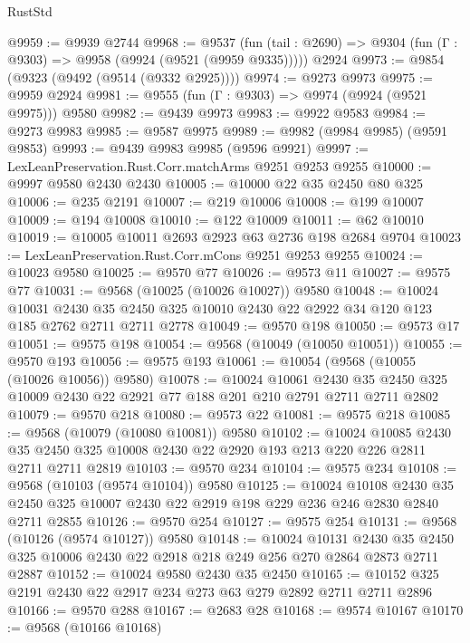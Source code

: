 \begin{lexlean}{RustStd}
\begin{coremodule}
{\begin{coremodule}
{{{{{{{{{{{{{{{{{{{{{{{{{{{{{{{{{{{{{{{{{{{{{{{{{{{{{{{@9959 := @9939 @2744
@9968 := @9537
    (fun (tail : @2690) => @9304 (fun (Γ : @9303) => @9958 (@9924 (@9521 (@9959 @9335)))))
    @2924
@9973 := @9854 (@9323 (@9492 (@9514 (@9332 @2925))))
@9974 := @9273 @9973
@9975 := @9959 @2924
@9981 := @9555 (fun (Γ : @9303) => @9974 (@9924 (@9521 @9975))) @9580
@9982 := @9439 @9973
@9983 := @9922 @9583
@9984 := @9273 @9983
@9985 := @9587 @9975
@9989 := @9982 (@9984 @9985) (@9591 @9853)
@9993 := @9439 @9983 @9985 (@9596 @9921)
@9997 := LexLeanPreservation.Rust.Corr.matchArms @9251 @9253 @9255
@10000 := @9997 @9580 @2430 @2430
@10005 := @10000 @22 @35 @2450 @80 @325
@10006 := @235 @2191
@10007 := @219 @10006
@10008 := @199 @10007
@10009 := @194 @10008
@10010 := @122 @10009
@10011 := @62 @10010
@10019 := @10005 @10011 @2693 @2923 @63 @2736 @198 @2684 @9704
@10023 := LexLeanPreservation.Rust.Corr.mCons @9251 @9253 @9255
@10024 := @10023 @9580
@10025 := @9570 @77
@10026 := @9573 @11
@10027 := @9575 @77
@10031 := @9568 (@10025 (@10026 @10027)) @9580
@10048 := @10024
    @10031
    @2430
    @35
    @2450
    @325
    @10010
    @2430
    @22
    @2922
    @34
    @120
    @123
    @185
    @2762
    @2711
    @2711
    @2778
@10049 := @9570 @198
@10050 := @9573 @17
@10051 := @9575 @198
@10054 := @9568 (@10049 (@10050 @10051))
@10055 := @9570 @193
@10056 := @9575 @193
@10061 := @10054 (@9568 (@10055 (@10026 @10056)) @9580)
@10078 := @10024
    @10061
    @2430
    @35
    @2450
    @325
    @10009
    @2430
    @22
    @2921
    @77
    @188
    @201
    @210
    @2791
    @2711
    @2711
    @2802
@10079 := @9570 @218
@10080 := @9573 @22
@10081 := @9575 @218
@10085 := @9568 (@10079 (@10080 @10081)) @9580
@10102 := @10024
    @10085
    @2430
    @35
    @2450
    @325
    @10008
    @2430
    @22
    @2920
    @193
    @213
    @220
    @226
    @2811
    @2711
    @2711
    @2819
@10103 := @9570 @234
@10104 := @9575 @234
@10108 := @9568 (@10103 (@9574 @10104)) @9580
@10125 := @10024
    @10108
    @2430
    @35
    @2450
    @325
    @10007
    @2430
    @22
    @2919
    @198
    @229
    @236
    @246
    @2830
    @2840
    @2711
    @2855
@10126 := @9570 @254
@10127 := @9575 @254
@10131 := @9568 (@10126 (@9574 @10127)) @9580
@10148 := @10024
    @10131
    @2430
    @35
    @2450
    @325
    @10006
    @2430
    @22
    @2918
    @218
    @249
    @256
    @270
    @2864
    @2873
    @2711
    @2887
@10152 := @10024 @9580 @2430 @35 @2450
@10165 := @10152 @325 @2191 @2430 @22 @2917 @234 @273 @63 @279 @2892 @2711 @2711 @2896
@10166 := @9570 @288
@10167 := @2683 @28
@10168 := @9574 @10167
@10170 := @9568 (@10166 @10168)
}}}}}}}}}}}}}}}}}}}}}}}}}}}}}}}}}}}}}}}}}}}}}}}}}}}}}}}
\end{coremodule}}
\end{coremodule}
\end{lexlean}
